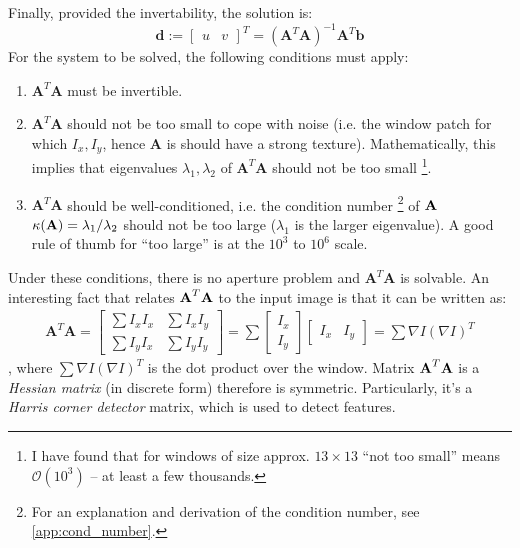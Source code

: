 \documentclass[a4paper]{article}
\begin{document}
Finally, provided the invertability,  the solution  is:
\begin{equation}
    \textbf{d} := \begin{bmatrix}
    u & v
    \end{bmatrix}^T =  (\textbf{A}^T\textbf{A})^{-1}\textbf{A}^T\textbf{b}
    \label{eq:harris_lin_sq_sol}
\end{equation}
For the system to be solved, the following conditions must apply:
\begin{enumerate}
    \item $\textbf{A}^T\textbf{A}$ must be invertible.
    \item $\textbf{A}^T\textbf{A}$ should not be too small to cope with noise (i.e. the window patch for which $I_x, I_y$, hence $\textbf{A}$ is should have a strong texture). Mathematically, this implies that eigenvalues $\lambda_1, \lambda_2$ of $\textbf{A}^T\textbf{A}$ should not be too small \footnote{I have found that for windows of size approx. $13\times 13$ ``not too small'' means $\mathcal{O}(10^3)$ -- at least a few thousands.}.
	\item $\textbf{A}^T\textbf{A}$ should be well-conditioned, i.e. the condition number \footnote{For an explanation and derivation of the condition number, see \ref{app:cond_number}.} of $\textbf{A}$ $\kappa(\textbf{A}) = \lambda_1 / \lambda_2$ should not be too large ($\lambda_1$ is the larger eigenvalue). A good rule of thumb for ``too large'' is at the $10^3$ to $10^6$ scale.
\end{enumerate}
Under these conditions, there is no aperture problem and $\textbf{A}^T\textbf{A}$ is solvable. An interesting fact that relates $\textbf{A}^T\textbf{A}$ to the input image is that it can be written as:
\begin{gather}
    \textbf{A}^T\textbf{A} = 
    \begin{bmatrix}
    \sum I_x I_x & \sum I_xI_y \\
    \sum I_y I_x & \sum I_y I_y
    \end{bmatrix} = 
    \sum \begin{bmatrix}
    I_x \\ I_y
    \end{bmatrix}
    \begin{bmatrix}
    I_x & I_y
    \end{bmatrix} = 
    \sum \nabla I (\nabla I)^T
\end{gather}
, where $\sum \nabla I (\nabla I)^T$ is the dot product over the window. Matrix $\textbf{A}^T\textbf{A}$ is a \textit{Hessian matrix} (in discrete form) therefore is symmetric. Particularly, it's a \textit{Harris corner detector} matrix, which is used to detect features.
\end{document}
